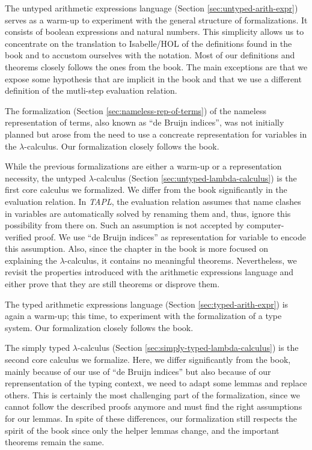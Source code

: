 The untyped arithmetic expressions language (Section \ref{sec:untyped-arith-expr}) serves as a
warm-up to experiment with the general structure of formalizations. It consists of boolean
expressions and natural numbers. This simplicity allows us to concentrate on the translation to
Isabelle/HOL of the definitions found in the book and to accustom ourselves with the notation. Most
of our definitions and theorems closely follows the ones from the book. The main exceptions are
that we expose some hypothesis that are implicit in the book and that we use a different definition
of the mutli-step evaluation relation.

The formalization (Section \ref{sec:nameless-rep-of-terms}) of the nameless representation of terms,
also known as ``de Bruijn indices'', was not initially planned but arose from the need to use a
concreate representation for variables in the $\lambda$-calculus. Our formalization closely follows
the book.

While the previous formalizations are either a warm-up or a representation necessity, the untyped
$\lambda$-calculus (Section \ref{sec:untyped-lambda-calculus}) is the first core calculus we
formalized. We differ from the book significantly in the evaluation relation. In \emph{TAPL}, the
evaluation relation assumes that name clashes in variables are automatically solved by renaming
them and, thus, ignore this possibility from there on. Such an assumption is not accepted by
computer-verified proof. We use ``de Bruijn indices'' as representation for variable to encode this
assumption. Also, since the chapter in the book is more focused on explaining the
$\lambda$-calculus, it contains no meaningful theorems. Nevertheless, we revisit the properties
introduced with the arithmetic expressions language and either prove that they are still theorems
or disprove them.

The typed arithmetic expressions language (Section \ref{sec:typed-arith-expr}) is again a warm-up;
this time, to experiment with the formalization of a type system. Our formalization closely follows
the book.

The simply typed $\lambda$-calculus (Section \ref{sec:simply-typed-lambda-calculus}) is the second
core calculus we formalize. Here, we differ significantly from the book, mainly because of our use
of ``de Bruijn indices'' but also because of our reprensentation of the typing context, we need to
adapt some lemmas and replace others. This is certainly the most challenging part of the
formalization, since we cannot follow the described proofs anymore and must find the right
assumptions for our lemmas. In spite of these differences, our formalization still respects the
spirit of the book since only the helper lemmas change, and the important theorems remain the same.

